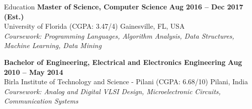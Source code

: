 \begin{rSection}{Education}
{\bfseries Master of Science, Computer Science} \hfill {\bfseries Aug 2016 -- Dec 2017 (Est.)} 
\\  University of Florida (CGPA: 3.47/4) \hfill Gainesville, FL, USA
\\ {\itshape {Coursework}: Programming Languages, Algorithm Analysis, Data Structures, Machine Learning, Data Mining}

{\bfseries Bachelor of Engineering, Electrical and Electronics Engineering} \hfill {\bfseries Aug 2010 -- May 2014}
\\ Birla Institute of Technology and Science - Pilani (CGPA: 6.68/10) \hfill Pilani, India
\\ {\itshape {Coursework}: Analog and Digital VLSI Design, Microelectronic Circuits, Communication Systems}

\end{rSection}